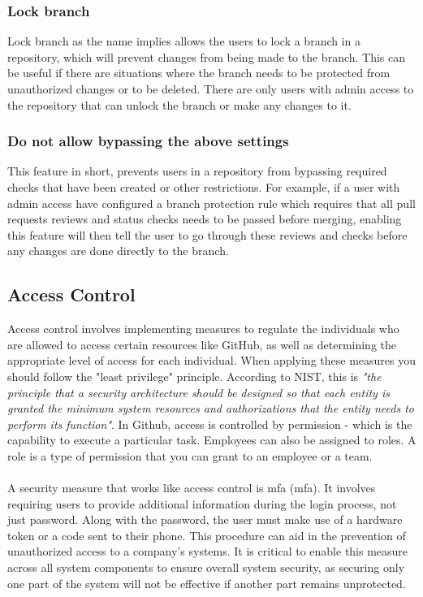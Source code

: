 \subsubsection{Lock branch}
Lock branch as the name implies allows the users to lock a branch in a repository, which will prevent changes from being made to the branch. This can be useful if there are situations where the branch needs to be protected from unauthorized changes or to be deleted. There are only users with admin access to the repository that can unlock the branch or make any changes to it. 

\subsubsection{Do not allow bypassing the above settings}
This feature in short, prevents users in a repository from bypassing required checks that have been created or other restrictions. For example, if a user with admin access have configured a branch protection rule which requires that all pull requests reviews and status checks needs to be passed before merging, enabling this feature will then tell the user to go through these reviews and checks before any changes are done directly to the branch. 
\newpage

\subsection{Access Control}
Access control involves implementing measures to regulate the individuals who are allowed to access certain resources like GitHub, as well as determining the appropriate level of access for each individual. When applying these measures you should follow the "least privilege" principle. According to NIST, this is \textit{"the principle that a security architecture should be designed so that each entity is granted the minimum system resources and authorizations that the entity needs to perform its function"}\cite{leastprivilege}. In Github, access is controlled by permission - which is the capability to execute a particular task. Employees can also be assigned to roles. A role is a type of permission that you can grant to an employee or a team. \cite{accesscontroll}
\\
\\
A security measure that works like access control is \acrlong{mfa} (\acrshort{mfa}). It involves requiring users to provide additional information during the login process, not just password. Along with the password, the user must make use of a hardware token or a code sent to their phone. 
This procedure can aid in the prevention of unauthorized access to a company's systems. It is critical to enable this measure across all system components to ensure overall system security, as securing only one part of the system will not be effective if another part remains unprotected. 


